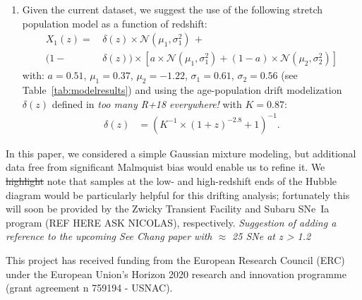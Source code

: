 \documentclass[]{aa} %
\newcommand{\nn}[1]{{\textcolor[rgb]{0.25, 0.50, 0}{#1}}}
\newcommand{\yc}[1]{{\textcolor{BrickRed}{#1}}}
\begin{document}
\begin{enumerate}
    \item Given the current dataset, we suggest the use of the following stretch
        population model as a function of redshift:
        \begin{align}\label{eqconclusion:stretchz}
            X_1\left(z \right) =
             &\,\delta(z)\times\mathcal{N}(\mu_1,\sigma_1^2)\,+\nonumber\\
            (1-&\,\delta(z)) \times  \left[a\times\mathcal{N}(\mu_1,\sigma_1^2) +
            (1-a)\times\mathcal{N}(\mu_2,\sigma_2^2)\right]
        \end{align}
        with: $a=0.51$, $\mu_1=0.37$, $\mu_2=-1.22$, $\sigma_1=0.61$,
        $\sigma_2=0.56$ (see Table~\ref{tab:modelresults}) and using the
        age-population drift modelization $\delta(z)$ defined in
        \cite{rigault2018} \yc{\textit{too many R+18 everywhere!}} with $K=0.87$:
        \begin{align}
            \delta(z) & = \left( K^{-1} \times (1+z)^{-2.8} +1 \right)^{-1}.
        \end{align}
\end{enumerate}

\nn{In this paper, we considered} a simple Gaussian mixture modeling, but
additional data free from significant Malmquist bias would enable us to refine
it. We \nn{\sout{highlight} note} that samples at the low- and high-redshift
ends of the Hubble diagram would be particularly helpful for this drifting
analysis; fortunately this will soon be provided by the Zwicky Transient
Facility \citep{bellm2019, graham2019} and Subaru SNe~Ia program (REF HERE ASK
NICOLAS), respectively. \nn{\textit{Suggestion of adding a reference to the
upcoming See Chang paper with $\approx$ 25 SNe at z > 1.2}}

\begin{acknowledgements}
    This project has received funding from the European Research Council (ERC)
    under the European Union's Horizon 2020 research and innovation programme
    (grant agreement n 759194 - USNAC).
\end{acknowledgements}
\end{document}
